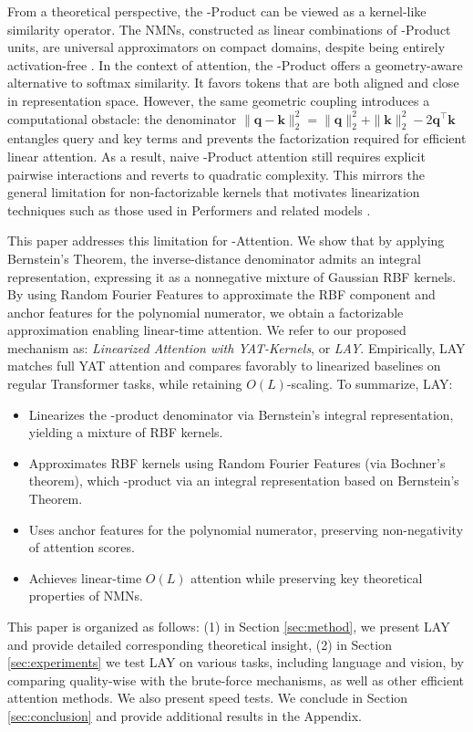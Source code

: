 \documentclass{article}
\DeclareRobustCommand{\E}{\text{\normalfont\tifinaghfont ⵟ}}
\begin{document}
From a theoretical perspective, the \E-Product can be viewed as a kernel-like similarity operator. The NMNs, constructed as linear combinations of \E-Product units, are universal approximators on compact domains, despite being entirely activation-free \citep{Author2026Concurrent}. In the context of attention, the \E-Product offers a geometry-aware alternative to softmax similarity. It favors tokens that are both aligned and close in representation space. However, the same geometric coupling introduces a computational obstacle: the denominator $\|\mathbf{q}-\mathbf{k}\|_{2}^2 = \|\mathbf{q}\|_{2}^2 + \|\mathbf{k}\|_{2}^2 - 2\mathbf{q}^\top \mathbf{k}$ entangles query and key terms and prevents the factorization required for efficient linear attention. As a result, naive \E-Product attention still requires explicit pairwise interactions and reverts to quadratic complexity. This mirrors the general limitation for non-factorizable kernels that motivates linearization techniques such as those used in Performers and related models \citep{performers, hedgehog, insuhan}.

This paper addresses this limitation for \E-Attention. We show that by applying Bernstein’s Theorem, the inverse-distance denominator admits an integral representation, expressing it as a nonnegative mixture of Gaussian RBF kernels. By using Random Fourier Features to approximate the RBF component and anchor features for the polynomial numerator, we obtain a factorizable approximation enabling linear-time attention. We refer to our proposed mechanism as: \emph{Linearized Attention with YAT-Kernels}, or \emph{LAY}. Empirically, LAY matches full YAT attention and compares favorably to linearized baselines on regular Transformer tasks, while retaining $O(L)$-scaling. To summarize, LAY:
\vspace{-2mm}
\begin{itemize}[leftmargin=1.4em]
\item Linearizes the \E-product denominator via Bernstein's integral representation, yielding a mixture of RBF kernels.
\vspace{-1mm}
\item Approximates RBF kernels using Random Fourier Features (via Bochner's theorem), which \E-product via an integral representation based on Bernstein’s Theorem.
\vspace{-1mm}
\item Uses anchor features for the polynomial numerator, preserving non-negativity of attention scores.
\vspace{-1mm}
\item Achieves linear-time $O(L)$ attention while preserving key theoretical properties of NMNs.
\end{itemize}
\vspace{-2mm}
This paper is organized as follows: (1) in Section \ref{sec:method}, we present LAY and provide detailed corresponding theoretical insight, (2) in Section \ref{sec:experiments} we test LAY on various tasks, including language and vision, by comparing quality-wise with the brute-force mechanisms, as well as other efficient attention methods. We also present speed tests. We conclude in Section \ref{sec:conclusion} and provide additional results in the Appendix.
\end{document}

